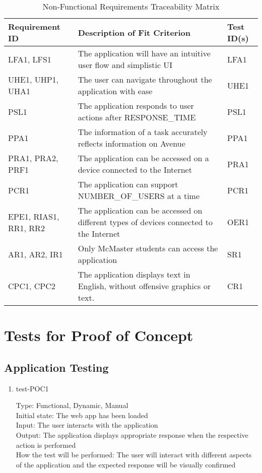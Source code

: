 \documentclass[12pt, titlepage]{article}
\begin{document}
\begin{table}[H]
\caption{Non-Functional Requirements Traceability Matrix}
\begin{center}
\begin{tabular}{ |m{7em}|m{20em}|m{6em}|} 
 \hline
 Requirement ID & Description of Fit Criterion & Test ID(s) \\ 
 \hline
 LFA1, LFS1 & The application will have an intuitive user flow and simplistic UI & LFA1\\
 \hline
 UHE1, UHP1, UHA1 & The user can navigate throughout the application with ease & UHE1\\
 \hline 
 PSL1 & The application responds to user actions after RESPONSE\_TIME & PSL1\\
 \hline
 PPA1 & The information of a task accurately reflects information on Avenue & PPA1\\
 \hline
 PRA1, PRA2, PRF1 & The application can be accessed on a device connected to the Internet & PRA1\\
 \hline
 PCR1 & The application can support NUMBER\_OF\_USERS at a time & PCR1\\
 \hline
 EPE1, RIAS1, RR1, RR2 & The application can be accessed on different types of devices connected to the Internet & OER1\\
 \hline
 AR1, AR2, IR1 & Only McMaster students can access the application & SR1\\
 \hline
 CPC1, CPC2 & The application displays text in English, without offensive graphics or text. & CR1\\
 \hline
\end{tabular}
\end{center}
\label{traceabilityNonFunc}
\end{table}

\section{Tests for Proof of Concept}

\subsection{Application Testing}

\begin{enumerate}
\item{test-POC1\\}

Type: Functional, Dynamic, Manual\\
Initial state: The web app has been loaded\\
Input: The user interacts with the application\\
Output: The application displays appropriate response when the respective action is performed\\
How the test will be performed: The user will interact with different aspects of the application and the expected response will be visually confirmed
\end{enumerate}
\end{document}
